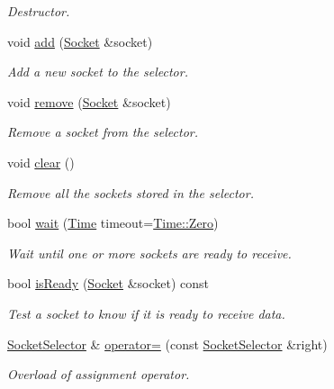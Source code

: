 \begin{DoxyCompactItemize}
\begin{DoxyCompactList}\small\item\em Destructor. \end{DoxyCompactList}\item 
void \hyperlink{classsf_1_1_socket_selector_ade952013232802ff7b9b33668f8d2096}{add} (\hyperlink{classsf_1_1_socket}{Socket} \&socket)
\begin{DoxyCompactList}\small\item\em Add a new socket to the selector. \end{DoxyCompactList}\item 
void \hyperlink{classsf_1_1_socket_selector_a98b6ab693a65b82caa375639232357c1}{remove} (\hyperlink{classsf_1_1_socket}{Socket} \&socket)
\begin{DoxyCompactList}\small\item\em Remove a socket from the selector. \end{DoxyCompactList}\item 
void \hyperlink{classsf_1_1_socket_selector_a76e650acb0199d4be91e90a493fbc91a}{clear} ()
\begin{DoxyCompactList}\small\item\em Remove all the sockets stored in the selector. \end{DoxyCompactList}\item 
bool \hyperlink{classsf_1_1_socket_selector_a9cfda5475f17925e65889394d70af702}{wait} (\hyperlink{classsf_1_1_time}{Time} timeout=\hyperlink{classsf_1_1_time_a8db127b632fa8da21550e7282af11fa0}{Time\+::\+Zero})
\begin{DoxyCompactList}\small\item\em Wait until one or more sockets are ready to receive. \end{DoxyCompactList}\item 
bool \hyperlink{classsf_1_1_socket_selector_a8e67b463db05eadb4d356992c896833c}{is\+Ready} (\hyperlink{classsf_1_1_socket}{Socket} \&socket) const 
\begin{DoxyCompactList}\small\item\em Test a socket to know if it is ready to receive data. \end{DoxyCompactList}\item 
\hyperlink{classsf_1_1_socket_selector}{Socket\+Selector} \& \hyperlink{classsf_1_1_socket_selector_ae6395c7a8d29a9ea14939cc5d1ba3a33}{operator=} (const \hyperlink{classsf_1_1_socket_selector}{Socket\+Selector} \&right)
\begin{DoxyCompactList}\small\item\em Overload of assignment operator. \end{DoxyCompactList}\end{DoxyCompactItemize}


